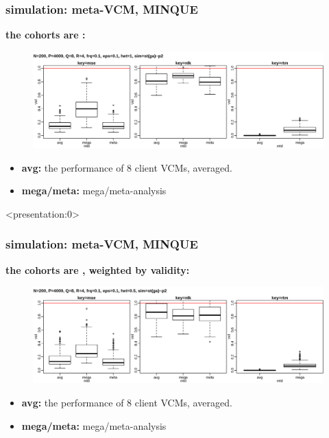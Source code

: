 \documentclass{beamer}
\begin{document}
\begin{frame} \frametitle{simulation: meta-VCM, MINQUE}
  \textbf{the cohorts are \color{red}{heterogeneous}:} \\
  \begin{figure}
    \centering \includegraphics[width=.95\linewidth]{img/met_het_stt_mnq_ssz}
  \end{figure}
  \textbf{\color{blue}{inner plot: strategies, from left to right:}}
  \begin{itemize}
  \item \textbf{avg:} the performance of 8 client VCMs, averaged.
  \item \textbf{mega/meta:} mega/meta-analysis
  \end{itemize}
\end{frame}
\begin{frame}<presentation:0> %
  \frametitle{simulation: meta-VCM, MINQUE} %
  \textbf{the cohorts are \color{red}{heterogeneous}, weighted by validity:} \\
  \begin{figure}
    \centering \includegraphics[width=.95\linewidth]{img/met_het_stt_mnq_cyh}
  \end{figure}
  \textbf{\color{blue}{inner plot: strategies, from left to right:}}
  \begin{itemize}
  \item \textbf{avg:} the performance of 8 client VCMs, averaged.
  \item \textbf{mega/meta:} mega/meta-analysis
  \end{itemize}
\end{frame}
\end{document}
